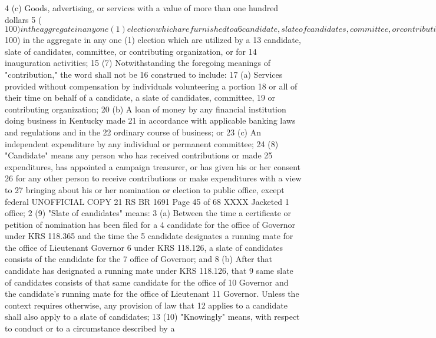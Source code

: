 4 (c) Goods, advertising, or services with a value of more than one hundred dollars
5 ($100) in the aggregate in any one (1) election which are furnished to a
6 candidate, slate of candidates, committee, or contributing organization or for
7 inauguration activities without charge, or at a rate which is less than the rate
8 normally charged for the goods or services; or
9 (d) Payment by any person other than a candidate, his or her authorized treasurer,
10 a slate of candidates, its authorized treasurer, a committee, or contributing
11 organization for any goods or services with a value of more than one hundred
12 dollars ($100) in the aggregate in any one (1) election which are utilized by a
13 candidate, slate of candidates, committee, or contributing organization, or for
14 inauguration activities;
15 (7) Notwithstanding the foregoing meanings of "contribution," the word shall not be
16 construed to include:
17 (a) Services provided without compensation by individuals volunteering a portion
18 or all of their time on behalf of a candidate, a slate of candidates, committee,
19 or contributing organization;
20 (b) A loan of money by any financial institution doing business in Kentucky made
21 in accordance with applicable banking laws and regulations and in the
22 ordinary course of business; or
23 (c) An independent expenditure by any individual or permanent committee;
24 (8) "Candidate" means any person who has received contributions or made
25 expenditures, has appointed a campaign treasurer, or has given his or her consent
26 for any other person to receive contributions or make expenditures with a view to
27 bringing about his or her nomination or election to public office, except federal 
UNOFFICIAL COPY 21 RS BR 1691
Page 45 of 68
XXXX Jacketed
1 office;
2 (9) "Slate of candidates" means:
3 (a) Between the time a certificate or petition of nomination has been filed for a
4 candidate for the office of Governor under KRS 118.365 and the time the
5 candidate designates a running mate for the office of Lieutenant Governor
6 under KRS 118.126, a slate of candidates consists of the candidate for the
7 office of Governor; and
8 (b) After that candidate has designated a running mate under KRS 118.126, that
9 same slate of candidates consists of that same candidate for the office of
10 Governor and the candidate's running mate for the office of Lieutenant
11 Governor. Unless the context requires otherwise, any provision of law that
12 applies to a candidate shall also apply to a slate of candidates;
13 (10) "Knowingly" means, with respect to conduct or to a circumstance described by a
